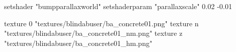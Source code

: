	setshader "bumpparallaxworld"
	setshaderparam "parallaxscale" 0.02 -0.01

		texture 0 "textures/blindabuser/ba_concrete01.png"
		texture n "textures/blindabuser/ba_concrete01_nm.png"
		texture z "textures/blindabuser/ba_concrete01_hm.png"
